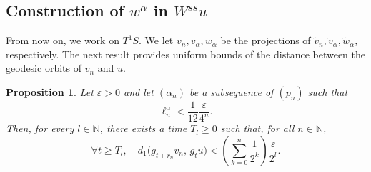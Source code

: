 \documentclass[a4paper,english,reqno]{amsart}
\newcommand{\N}{\mathbb{N}} %
\newtheorem{proposition}{Proposition}
\theoremstyle{definition}
\numberwithin{equation}{section}
\begin{document}
\subsection{Construction of $w^\alpha$ in $W^{ss} u$}


From now on, we work on $T^1 S$. We let $v_n, v_{\alpha}, w_{\alpha}$ be the projections of $\tilde v_n, \tilde v_{\alpha}, \tilde w_{\alpha}$, respectively. The next result provides uniform bounds of the distance between the geodesic orbits of $v_n$ and $u$.

\begin{proposition}
	Let $\varepsilon>0$ and let $(\alpha_n)$ be a subsequence of $(p_n)$ such that
	\[
	\ell_n^\alpha < \frac{1}{12}\frac{\varepsilon}{4^n}.
	\]
	Then, for every $l\in \N$, there exists a time $T_l \ge 0$ such that, for all
	$n \in \mathbb{N}$,
	\begin{equation}\label{Pm}
			\forall t\ge T_l,\quad d_1\big(g_{t+r_n} v_n,\, g_t u\big)
		<
		\left(\sum_{k=0}^{n} \frac{1}{2^k}\right)\frac{\varepsilon}{2^l}.
	\end{equation}
\end{proposition}
\end{document}
